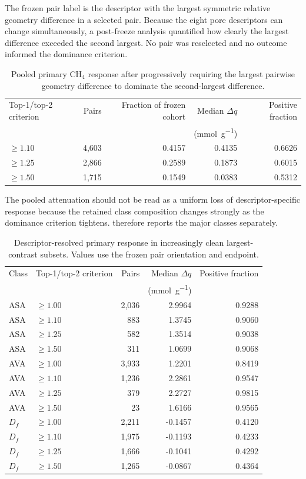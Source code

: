 \documentclass[11pt,a4paper]{article}
\begin{document}
The frozen pair label is the descriptor with the largest symmetric relative geometry
difference in a selected pair. Because the eight pore descriptors can change
simultaneously, a post-freeze analysis quantified how clearly the largest difference
exceeded the second largest. No pair was reselected and no outcome informed the
dominance criterion.

\begin{table}[H]
\centering
\caption{Pooled primary CH$_4$ response after progressively requiring the largest
pairwise geometry difference to dominate the second-largest difference.}
\label{tab:S26}
\begin{tabular}{lrrrr}
\toprule
Top-1/top-2 criterion & Pairs & Fraction of frozen cohort & Median $\Delta q$ & Positive fraction \\
 & & & (\si{\milli\mole\per\gram}) & \\
\midrule
$\geq1.10$ & 4,603 & 0.4157 & 0.4135 & 0.6626 \\
$\geq1.25$ & 2,866 & 0.2589 & 0.1873 & 0.6015 \\
$\geq1.50$ & 1,715 & 0.1549 & 0.0383 & 0.5312 \\
\bottomrule
\end{tabular}
\end{table}

The pooled attenuation should not be read as a uniform loss of descriptor-specific
response because the retained class composition changes strongly as the dominance
criterion tightens.  therefore reports the major classes separately.

\begin{table}[H]
\centering
\caption{Descriptor-resolved primary response in increasingly clean
largest-contrast subsets. Values use the frozen pair orientation and endpoint.}
\label{tab:S27}
\begin{tabular}{llrrr}
\toprule
Class & Top-1/top-2 criterion & Pairs & Median $\Delta q$ & Positive fraction \\
 & & & (\si{\milli\mole\per\gram}) & \\
\midrule
ASA & $\geq1.00$ & 2,036 & 2.9964 & 0.9288 \\
ASA & $\geq1.10$ & 883 & 1.3745 & 0.9060 \\
ASA & $\geq1.25$ & 582 & 1.3514 & 0.9038 \\
ASA & $\geq1.50$ & 311 & 1.0699 & 0.9068 \\
\addlinespace
AVA & $\geq1.00$ & 3,933 & 1.2201 & 0.8419 \\
AVA & $\geq1.10$ & 1,236 & 2.2861 & 0.9547 \\
AVA & $\geq1.25$ & 379 & 2.2727 & 0.9815 \\
AVA & $\geq1.50$ & 23 & 1.6166 & 0.9565 \\
\addlinespace
$D_f$ & $\geq1.00$ & 2,211 & -0.1457 & 0.4120 \\
$D_f$ & $\geq1.10$ & 1,975 & -0.1193 & 0.4233 \\
$D_f$ & $\geq1.25$ & 1,666 & -0.1041 & 0.4292 \\
$D_f$ & $\geq1.50$ & 1,265 & -0.0867 & 0.4364 \\
\bottomrule
\end{tabular}
\end{table}
\end{document}
